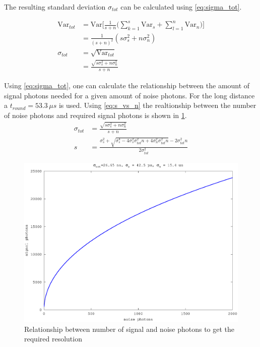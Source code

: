 The resulting standard deviation $\sigma_{tot}$ can be calculated using \cref{eq:sigma_tot}.

\begin{align}
\text{Var}_{tot} &= \text{Var}\Big[\frac{1}{s+n}\Big(\sum_{k=1}^s\text{Var}_s+\sum_{l=1}^n\text{Var}_n\Big)\Big]\\
&= \frac{1}{(s+n)^2}(s\sigma_s^2+n\sigma_n^2)\\
\sigma_{tot} &= \sqrt{\text{Var}_{tot}}\\
&= \frac{\sqrt{s\sigma_s^2+n\sigma_n^2}}{s+n} \label{eq:sigma_tot}
\end{align}

Using \cref{eq:sigma_tot}, one can calculate the relationship between the amount of signal photons needed for a given amount of noise photons. For the long distance a $t_{round}=53.3\,\mu s$ is used. Using \cref{eq:s_vs_n} the realtionship between the number of noise photons and required signal photons is shown in \cref{fig:altimetry_s_vs_n_small}.
\begin{align}
\sigma_{tot} &= \frac{\sqrt{s\sigma_s^2+n\sigma_n^2}}{s+n} \\
s &= \frac{\sigma_s^2+\sqrt{\sigma_s^4-4\sigma_s^2\sigma_{tot}^2n+4\sigma_n^2\sigma_{tot}^2n}-2\sigma_{tot}^2n}{2\sigma_{tot}^2}\label{eq:s_vs_n}
\end{align} 

\begin{figure}[h]
\centering
	\includegraphics[width=0.8\linewidth]{fig/altimetry_s_vs_n_small.eps}
\caption{Relationship between number of signal and noise photons to get the required resolution}
\label{fig:altimetry_s_vs_n_small}
\end{figure}

